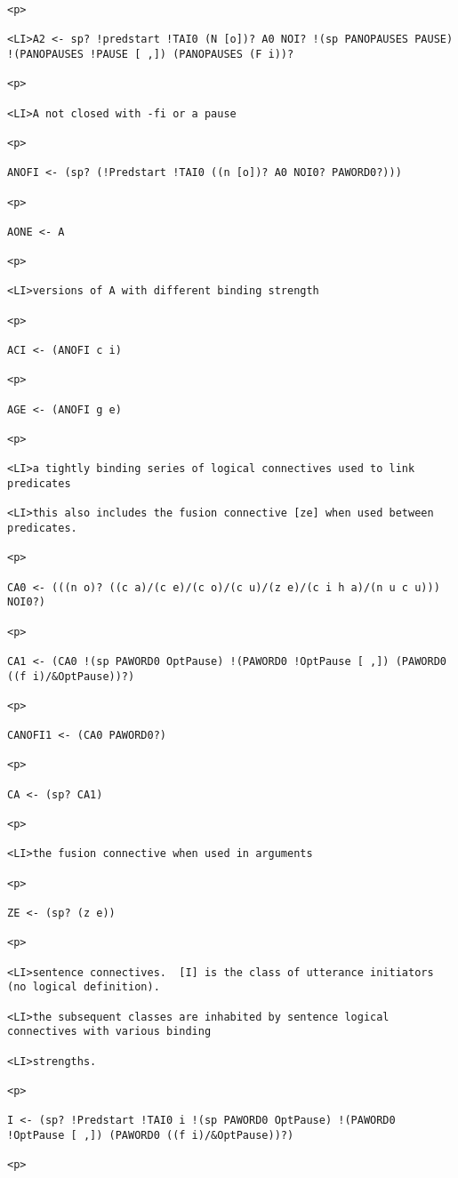 \documentclass[12pt]{article}
\begin{document}
\begin{lstlisting}
<p>

<LI>A2 <- sp? !predstart !TAI0 (N [o])? A0 NOI? !(sp PANOPAUSES PAUSE) !(PANOPAUSES !PAUSE [ ,]) (PANOPAUSES (F i))?

<p>

<LI>A not closed with -fi or a pause

<p>

ANOFI <- (sp? (!Predstart !TAI0 ((n [o])? A0 NOI0? PAWORD0?)))

<p>

AONE <- A

<p>

<LI>versions of A with different binding strength

<p>

ACI <- (ANOFI c i)

<p>

AGE <- (ANOFI g e)

<p>

<LI>a tightly binding series of logical connectives used to link predicates

<LI>this also includes the fusion connective [ze] when used between predicates.

<p>

CA0 <- (((n o)? ((c a)/(c e)/(c o)/(c u)/(z e)/(c i h a)/(n u c u))) NOI0?)

<p>

CA1 <- (CA0 !(sp PAWORD0 OptPause) !(PAWORD0 !OptPause [ ,]) (PAWORD0 ((f i)/&OptPause))?)

<p>

CANOFI1 <- (CA0 PAWORD0?)

<p>

CA <- (sp? CA1)

<p>

<LI>the fusion connective when used in arguments

<p>

ZE <- (sp? (z e))

<p>

<LI>sentence connectives.  [I] is the class of utterance initiators (no logical definition).

<LI>the subsequent classes are inhabited by sentence logical connectives with various binding

<LI>strengths.

<p>

I <- (sp? !Predstart !TAI0 i !(sp PAWORD0 OptPause) !(PAWORD0 !OptPause [ ,]) (PAWORD0 ((f i)/&OptPause))?)

<p>


\end{lstlisting}
\end{document}
